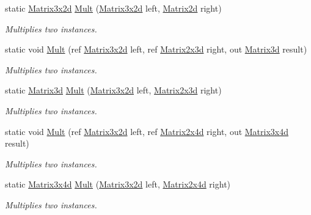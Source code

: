 \begin{DoxyCompactItemize}
static \hyperlink{struct_open_t_k_1_1_matrix3x2d}{Matrix3x2d} \hyperlink{struct_open_t_k_1_1_matrix3x2d_a3cb5b4bfa192c1f4b1a9c1c48441b1c5}{Mult} (\hyperlink{struct_open_t_k_1_1_matrix3x2d}{Matrix3x2d} left, \hyperlink{struct_open_t_k_1_1_matrix2d}{Matrix2d} right)
\begin{DoxyCompactList}\small\item\em Multiplies two instances. \end{DoxyCompactList}\item 
static void \hyperlink{struct_open_t_k_1_1_matrix3x2d_ac910a0775bcd4bd789015377cb910191}{Mult} (ref \hyperlink{struct_open_t_k_1_1_matrix3x2d}{Matrix3x2d} left, ref \hyperlink{struct_open_t_k_1_1_matrix2x3d}{Matrix2x3d} right, out \hyperlink{struct_open_t_k_1_1_matrix3d}{Matrix3d} result)
\begin{DoxyCompactList}\small\item\em Multiplies two instances. \end{DoxyCompactList}\item 
static \hyperlink{struct_open_t_k_1_1_matrix3d}{Matrix3d} \hyperlink{struct_open_t_k_1_1_matrix3x2d_a2c7ba9afd84b1c7052cf0a0b41d0b687}{Mult} (\hyperlink{struct_open_t_k_1_1_matrix3x2d}{Matrix3x2d} left, \hyperlink{struct_open_t_k_1_1_matrix2x3d}{Matrix2x3d} right)
\begin{DoxyCompactList}\small\item\em Multiplies two instances. \end{DoxyCompactList}\item 
static void \hyperlink{struct_open_t_k_1_1_matrix3x2d_a2cdbdea9e18e697ece9e15a181510679}{Mult} (ref \hyperlink{struct_open_t_k_1_1_matrix3x2d}{Matrix3x2d} left, ref \hyperlink{struct_open_t_k_1_1_matrix2x4d}{Matrix2x4d} right, out \hyperlink{struct_open_t_k_1_1_matrix3x4d}{Matrix3x4d} result)
\begin{DoxyCompactList}\small\item\em Multiplies two instances. \end{DoxyCompactList}\item 
static \hyperlink{struct_open_t_k_1_1_matrix3x4d}{Matrix3x4d} \hyperlink{struct_open_t_k_1_1_matrix3x2d_ab0ecea6fcdae00d53983e8c59d6fc266}{Mult} (\hyperlink{struct_open_t_k_1_1_matrix3x2d}{Matrix3x2d} left, \hyperlink{struct_open_t_k_1_1_matrix2x4d}{Matrix2x4d} right)
\begin{DoxyCompactList}\small\item\em Multiplies two instances. \end{DoxyCompactList}\item 

\end{DoxyCompactItemize}
